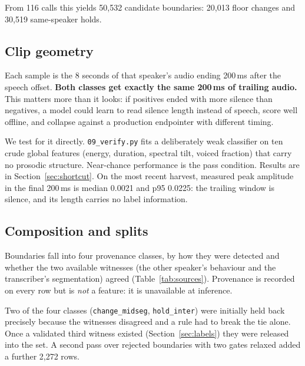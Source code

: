 \documentclass[11pt]{article}
\begin{document}
From 116 calls this yields 50,532 candidate boundaries: 20,013 floor changes
and 30,519 same-speaker holds.

\subsection{Clip geometry}

Each sample is the 8 seconds of that speaker's audio ending 200\,ms after the
speech offset. \textbf{Both classes get exactly the same 200\,ms of trailing
audio.} This matters more than it looks: if positives ended with more silence
than negatives, a model could learn to read silence length instead of speech,
score well offline, and collapse against a production endpointer with different
timing.

We test for it directly. \texttt{09\_verify.py} fits a
deliberately weak classifier on ten crude global features (energy, duration,
spectral tilt, voiced fraction) that carry no prosodic structure. Near-chance
performance is the pass condition. Results are in Section~\ref{sec:shortcut}.
On the most recent harvest, measured peak amplitude in the final 200\,ms is
median 0.0021 and p95 0.0225: the trailing window is silence, and its length
carries no label information.

\subsection{Composition and splits}

Boundaries fall into four provenance classes, by how they were detected and
whether the two available witnesses (the other speaker's behaviour and the
transcriber's segmentation) agreed (Table~\ref{tab:sources}). Provenance is
recorded on every row but is \emph{not} a feature: it is unavailable at
inference.

Two of the four classes (\texttt{change\_midseg}, \texttt{hold\_inter}) were
initially held back precisely because the witnesses disagreed and a rule had to
break the tie alone. Once a validated third witness existed
(Section~\ref{sec:labels}) they were released into the set. A second pass over
rejected boundaries with two gates relaxed added a further 2,272 rows.
\end{document}
